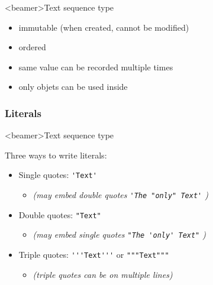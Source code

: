 \begin{frame}<beamer>{Text sequence type}

  \begin{itemize}
    \item<1-> immutable (when created, cannot be modified)
    \item<2-> ordered
    \item<3-> same value can be recorded multiple times
    \item<4-> only  objets can be used inside
  \end{itemize}

\end{frame}


\subsubsection{Literals}

\begin{frame}<beamer>{Text sequence type}

   Three ways to write literals:

  \medskip

  \begin{itemize}
    \item<1-> Single quotes: \lstinline|'Text'|
    \begin{itemize}
      \item<2-> \textit{(may embed double quotes \lstinline|'The "only" Text'| )}
    \end{itemize}

    \medskip

    \item<3-> Double quotes: \lstinline|"Text"|
    \begin{itemize}
      \item<4-> \textit{(may embed single quotes \lstinline|"The 'only' Text"| )}
    \end{itemize}

    \medskip

    \item<5-> Triple quotes: \lstinline|'''Text'''| or \lstinline|"""Text"""|
    \begin{itemize}
      \item<6-> \textit{(triple quotes can be on multiple lines)}
    \end{itemize}
  \end{itemize}

\end{frame}


